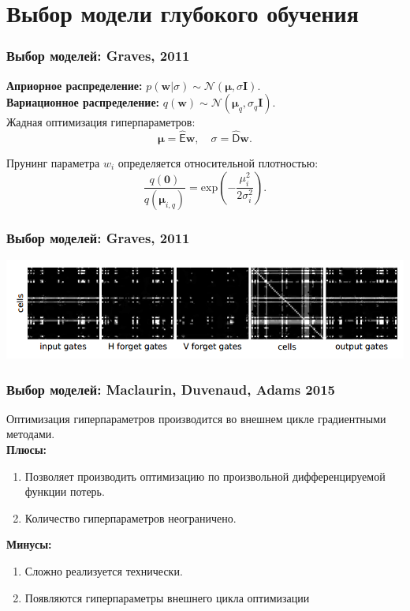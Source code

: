 \documentclass[10pt,pdf,utf8,russian,aspectratio=169]{beamer}
\begin{document}
\section{Выбор модели глубокого обучения}

\begin{frame}
\frametitle{Выбор моделей: Graves, 2011}
\textbf{Априорное распределение:} $p(\mathbf{w}|\sigma) \sim \mathcal{N}(\boldsymbol{\mu}, \sigma \mathbf{I}).$\\
\textbf{Вариационное распределение:} $q (\mathbf{w}) \sim \mathcal{N}(\boldsymbol{\mu}_q, \sigma_q \mathbf{I}).$\\
Жадная оптимизация гиперпараметров:
\[
	\boldsymbol{\mu} = \hat{\mathsf{E}} \mathbf{w},
\quad
	\sigma = \hat{\mathsf{D}} \mathbf{w}.
\]

Прунинг параметра ${w}_i$ определяется относительной плотностью:
\[
	\frac{q(\mathbf{0})}{q(\boldsymbol{\mu}_{i,q})}  = \text{exp}(-\frac{\mu_i^2}{2\sigma_i^2}).
\]
\end{frame}


\begin{frame}
\frametitle{Выбор моделей: Graves, 2011}
\includegraphics[width=\textwidth]{graves.png}
\end{frame}


\begin{frame}
\frametitle{Выбор моделей: Maclaurin, Duvenaud, Adams 2015}
Оптимизация гиперпараметров производится во внешнем цикле градиентными методами.\\
\textbf{Плюсы:}
\begin{enumerate}
\item Позволяет производить оптимизацию по произвольной дифференцируемой функции потерь.
\item Количество гиперпараметров неограничено.
\end{enumerate}
\textbf{Минусы:}
\begin{enumerate}
\item Сложно реализуется технически.
\item Появляются гиперпараметры внешнего цикла оптимизации
\end{enumerate}

\end{frame}
\end{document}

